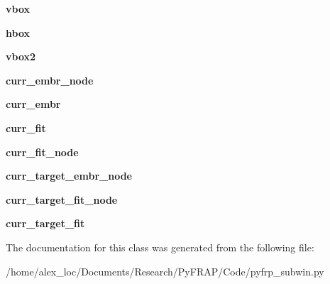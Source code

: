 \begin{DoxyCompactItemize}
\item 
\hypertarget{classpyfrp__subwin_1_1select__fits_a90d470b7ab5e1c22e751fc28aeb742b5}{{\bfseries vbox}}\label{classpyfrp__subwin_1_1select__fits_a90d470b7ab5e1c22e751fc28aeb742b5}

\item 
\hypertarget{classpyfrp__subwin_1_1select__fits_ae5b590957cf50f1b05ed87ff349f4db2}{{\bfseries hbox}}\label{classpyfrp__subwin_1_1select__fits_ae5b590957cf50f1b05ed87ff349f4db2}

\item 
\hypertarget{classpyfrp__subwin_1_1select__fits_a907fa7dc424414159af42a723a61e8ab}{{\bfseries vbox2}}\label{classpyfrp__subwin_1_1select__fits_a907fa7dc424414159af42a723a61e8ab}

\item 
\hypertarget{classpyfrp__subwin_1_1select__fits_ac5a4780e0c6122960ce17ea6088b2322}{{\bfseries curr\+\_\+embr\+\_\+node}}\label{classpyfrp__subwin_1_1select__fits_ac5a4780e0c6122960ce17ea6088b2322}

\item 
\hypertarget{classpyfrp__subwin_1_1select__fits_a891057c28371ff1daa0f206eee20d4f2}{{\bfseries curr\+\_\+embr}}\label{classpyfrp__subwin_1_1select__fits_a891057c28371ff1daa0f206eee20d4f2}

\item 
\hypertarget{classpyfrp__subwin_1_1select__fits_a4262a7c8e85d6b363aaec9f15fe2d750}{{\bfseries curr\+\_\+fit}}\label{classpyfrp__subwin_1_1select__fits_a4262a7c8e85d6b363aaec9f15fe2d750}

\item 
\hypertarget{classpyfrp__subwin_1_1select__fits_a958b2fdb6cd4d2e647da53a44d57a9f2}{{\bfseries curr\+\_\+fit\+\_\+node}}\label{classpyfrp__subwin_1_1select__fits_a958b2fdb6cd4d2e647da53a44d57a9f2}

\item 
\hypertarget{classpyfrp__subwin_1_1select__fits_a8fa3670eb0c305db232620fb4a452f7b}{{\bfseries curr\+\_\+target\+\_\+embr\+\_\+node}}\label{classpyfrp__subwin_1_1select__fits_a8fa3670eb0c305db232620fb4a452f7b}

\item 
\hypertarget{classpyfrp__subwin_1_1select__fits_a2f5e8f4ef911dfefd79881d4e7bd0078}{{\bfseries curr\+\_\+target\+\_\+fit\+\_\+node}}\label{classpyfrp__subwin_1_1select__fits_a2f5e8f4ef911dfefd79881d4e7bd0078}

\item 
\hypertarget{classpyfrp__subwin_1_1select__fits_a68734016f3ca399ba96727341c28d4fe}{{\bfseries curr\+\_\+target\+\_\+fit}}\label{classpyfrp__subwin_1_1select__fits_a68734016f3ca399ba96727341c28d4fe}

\end{DoxyCompactItemize}


The documentation for this class was generated from the following file\+:\begin{DoxyCompactItemize}
\item 
/home/alex\+\_\+loc/\+Documents/\+Research/\+Py\+F\+R\+A\+P/\+Code/pyfrp\+\_\+subwin.\+py\end{DoxyCompactItemize}
